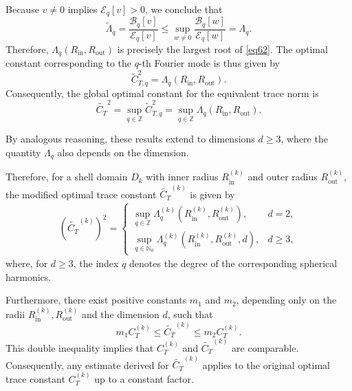 \documentclass[12pt,reqno]{amsart}
\numberwithin{equation}{section}
\begin{document}
Because $v \neq 0$ implies $\mathcal{E}_q[v] > 0$, we conclude that
\begin{equation*}
    \widetilde{\Lambda}_q = \frac{\mathcal{B}_q[v]}{\mathcal{E}_q[v]} \le \sup_{w \neq 0} \frac{\mathcal{B}_q[w]}{\mathcal{E}_q[w]} = \Lambda_q.
\end{equation*}
Therefore, $\Lambda_q(R_{\mathrm{in}}, R_{\mathrm{out}})$ is precisely the largest root of \eqref{eq62}. The optimal constant corresponding to the $q$-th Fourier mode is thus given by
\begin{equation*}
    \widetilde{C}_{T,q}^2 = \Lambda_q(R_{\mathrm{in}}, R_{\mathrm{out}}).
\end{equation*}
Consequently, the global optimal constant for the equivalent trace norm is
\begin{equation*}
    \widetilde{C_T}^2 = \sup_{q \in \mathbb{Z}} \widetilde{C}_{T,q}^2 = \sup_{q \in \mathbb{Z}} \Lambda_q(R_{\mathrm{in}}, R_{\mathrm{out}}).
\end{equation*}




By analogous reasoning, these results extend to dimensions $d \ge 3$, where the quantity $\Lambda_q$ also depends on the dimension.

Therefore, for a shell domain $D_k$ with inner radius $R_{\mathrm{in}}^{(k)}$ and outer radius $R_{\mathrm{out}}^{(k)}$, the modified optimal trace constant $\widetilde{C_T}^{(k)}$ is given by
\begin{align}
\label{eq:trace_constant}
\left(\widetilde{C_T}^{(k)}\right)^2 = 
\begin{cases} 
\sup\limits_{q \in \mathbb{Z}} \Lambda_q^{(k)}(R_{\mathrm{in}}^{(k)}, R_{\mathrm{out}}^{(k)}), & d = 2, \\
\sup\limits_{q \in \mathbb{N}_0} \Lambda_q^{(k)}(R_{\mathrm{in}}^{(k)}, R_{\mathrm{out}}^{(k)}, d), & d \ge 3,
\end{cases}
\end{align}
where, for $d \ge 3$, the index $q$ denotes the degree of the corresponding spherical harmonics.

Furthermore, there exist positive constants $m_1$ and $m_2$, depending only on the radii $R_{\mathrm{in}}^{(k)}, R_{\mathrm{out}}^{(k)}$ and the dimension $d$, such that
\begin{equation*}
m_1 C_T^{(k)} \le \widetilde{C_T}^{(k)} \le m_2 C_T^{(k)}.
\end{equation*}
This double inequality implies that $C_T^{(k)}$ and $\widetilde{C_T}^{(k)}$ are comparable. Consequently, any estimate derived for $\widetilde{C_T}^{(k)}$ applies to the original optimal trace constant $C_T^{(k)}$ up to a constant factor.
\end{document}
